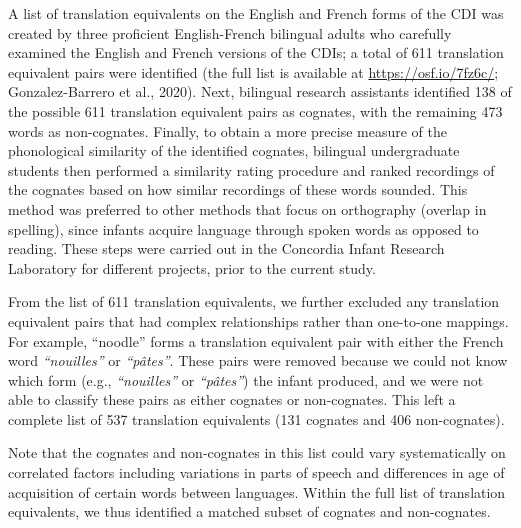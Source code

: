 \documentclass[
  english,
  ,man,floatsintext]{apa6}
\begin{document}
A list of translation equivalents on the English and French forms of the CDI was created by three proficient English-French bilingual adults who carefully examined the English and French versions of the CDIs; a total of 611 translation equivalent pairs were identified (the full list is available at \url{https://osf.io/7fz6c/}; Gonzalez-Barrero et al., 2020). Next, bilingual research assistants identified 138 of the possible 611 translation equivalent pairs as cognates, with the remaining 473 words as non-cognates. Finally, to obtain a more precise measure of the phonological similarity of the identified cognates, bilingual undergraduate students then performed a similarity rating procedure and ranked recordings of the cognates based on how similar recordings of these words sounded. This method was preferred to other methods that focus on orthography (overlap in spelling), since infants acquire language through spoken words as opposed to reading. These steps were carried out in the Concordia Infant Research Laboratory for different projects, prior to the current study.

From the list of 611 translation equivalents, we further excluded any translation equivalent pairs that had complex relationships rather than one-to-one mappings. For example, ``noodle'' forms a translation equivalent pair with either the French word \emph{``nouilles''} or \emph{``pâtes''}. These pairs were removed because we could not know which form (e.g., \emph{``nouilles''} or \emph{``pâtes''}) the infant produced, and we were not able to classify these pairs as either cognates or non-cognates. This left a complete list of 537 translation equivalents (131 cognates and 406 non-cognates).

Note that the cognates and non-cognates in this list could vary systematically on correlated factors including variations in parts of speech and differences in age of acquisition of certain words between languages. Within the full list of translation equivalents, we thus identified a matched subset of cognates and non-cognates.
\end{document}
